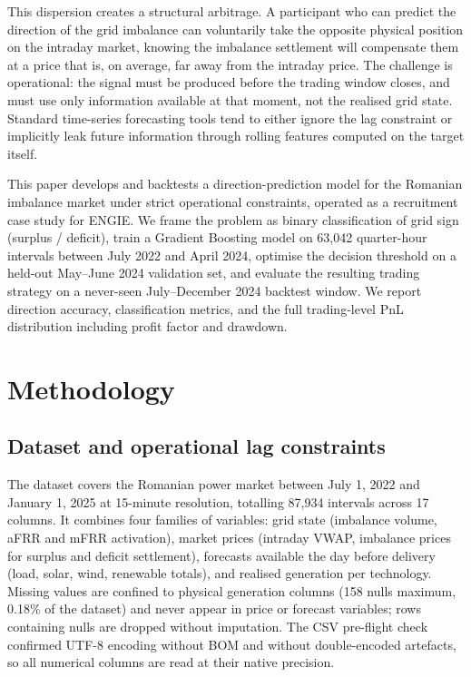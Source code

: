 \documentclass{article}
\begin{document}
This dispersion creates a structural arbitrage. A participant who can predict the direction of the grid imbalance can voluntarily take the opposite physical position on the intraday market, knowing the imbalance settlement will compensate them at a price that is, on average, far away from the intraday price. The challenge is operational: the signal must be produced before the trading window closes, and must use only information available at that moment, not the realised grid state. Standard time-series forecasting tools tend to either ignore the lag constraint or implicitly leak future information through rolling features computed on the target itself.

This paper develops and backtests a direction-prediction model for the Romanian imbalance market under strict operational constraints, operated as a recruitment case study for ENGIE. We frame the problem as binary classification of grid sign (surplus / deficit), train a Gradient Boosting model on 63{,}042 quarter-hour intervals between July 2022 and April 2024, optimise the decision threshold on a held-out May--June 2024 validation set, and evaluate the resulting trading strategy on a never-seen July--December 2024 backtest window. We report direction accuracy, classification metrics, and the full trading-level PnL distribution including profit factor and drawdown.

\section{Methodology}

\subsection{Dataset and operational lag constraints}

The dataset covers the Romanian power market between July 1, 2022 and January 1, 2025 at 15-minute resolution, totalling 87{,}934 intervals across 17 columns. It combines four families of variables: grid state (imbalance volume, aFRR and mFRR activation), market prices (intraday VWAP, imbalance prices for surplus and deficit settlement), forecasts available the day before delivery (load, solar, wind, renewable totals), and realised generation per technology. Missing values are confined to physical generation columns (158 nulls maximum, 0.18\% of the dataset) and never appear in price or forecast variables; rows containing nulls are dropped without imputation. The CSV pre-flight check confirmed UTF-8 encoding without BOM and without double-encoded artefacts, so all numerical columns are read at their native precision.
\end{document}
